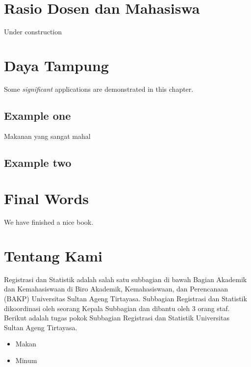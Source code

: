 \documentclass[
]{book}
\providecommand{\tightlist}{%
  \setlength{\itemsep}{0pt}\setlength{\parskip}{0pt}}
\begin{document}
\hypertarget{rasio-dosen-dan-mahasiswa}{%
\chapter{Rasio Dosen dan Mahasiswa}\label{rasio-dosen-dan-mahasiswa}}

Under construction

\hypertarget{daya-tampung}{%
\chapter{Daya Tampung}\label{daya-tampung}}

Some \emph{significant} applications are demonstrated in this chapter.

\hypertarget{example-one}{%
\section{Example one}\label{example-one}}

Makanan yang sangat mahal

\hypertarget{example-two}{%
\section{Example two}\label{example-two}}

\hypertarget{final-words}{%
\chapter{Final Words}\label{final-words}}

We have finished a nice book.

\hypertarget{tentang-kami}{%
\chapter*{Tentang Kami}\label{tentang-kami}}

Registrasi dan Statistik adalah salah satu subbagian di bawah Bagian Akademik dan Kemahasiswaan di Biro Akademik, Kemahasiswaan, dan Perencanaan (BAKP) Universitas Sultan Ageng Tirtayasa. Subbagian Registrasi dan Statistik dikoordinasi oleh seorang Kepala Subbagian dan dibantu oleh 3 orang staf. Berikut adalah tugas pokok Subbagian Registrasi dan Statistik Universitas Sultan Ageng Tirtayasa.

\begin{itemize}
\tightlist
\item
  Makan
\item
  Minum
\end{itemize}

  
\end{document}
